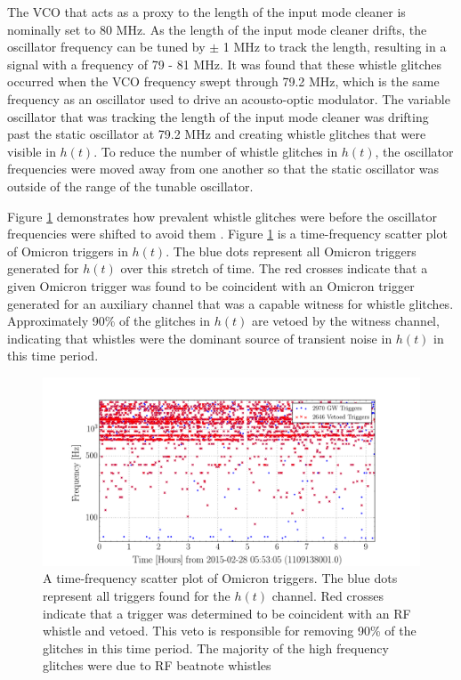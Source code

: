 The VCO that acts as a proxy to the length of the input mode cleaner is 
nominally set to 80 MHz. As the length of the input mode cleaner drifts, the 
oscillator frequency can be tuned by $\pm$ 1 MHz to track the length, resulting 
in a signal with a frequency of 79 - 81 MHz. It was found that these whistle 
glitches occurred when the VCO frequency swept through 79.2 MHz, which is the 
same frequency as an oscillator used to drive an acousto-optic modulator. 
The variable oscillator that was tracking the length of the input mode cleaner 
was drifting past the static oscillator at 79.2 MHz and creating whistle glitches 
that were visible in $h(t)$.  
To reduce the number of whistle glitches in $h(t)$, the oscillator frequencies 
were moved away from one another so that the static oscillator was outside 
of the range of the tunable oscillator.

Figure \ref{fig:hveto-whistles} demonstrates how prevalent whistle glitches were 
before the oscillator frequencies were shifted to avoid them \cite{Nuttall:2015dqa}. 
Figure 
\ref{fig:hveto-whistles} is a time-frequency scatter plot of Omicron triggers in 
$h(t)$. The blue dots represent all Omicron triggers generated for $h(t)$ over 
this stretch of time. The red crosses indicate that a given Omicron trigger was found 
to be coincident with an Omicron trigger generated for an auxiliary channel that 
was a capable witness for whistle glitches. Approximately 90\% of the glitches in 
$h(t)$ are vetoed by the witness channel, indicating that whistles were the dominant 
source of transient noise in $h(t)$ in this time period. 


\begin{figure}[ht!]%
\includegraphics[width=\textwidth]{figures/detchar/Hveto_whistles_time_frequency}
\caption[Vetoed whistles from Hveto]{A time-frequency scatter plot of Omicron %
         triggers. The blue dots represent all triggers found for the $h(t)$ channel. %
         Red crosses indicate that a trigger was determined to be coincident with an %
         RF whistle and vetoed. This veto is responsible for removing 90\% of the %
         glitches in this time period. The majority of the high frequency glitches %
         were due to RF beatnote whistles}
\label{fig:hveto-whistles}
\end{figure}

